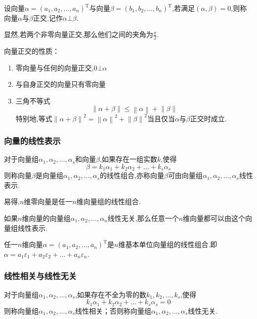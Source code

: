 \begin{definition}
    设向量$\alpha=(a_1,a_2,\dots,a_n)^\mathrm{T}$与向量$\beta=(b_1,b_2,\dots,b_n)^\mathrm{T}$,若满足$(\alpha,\beta)=0$,则称向量$\alpha$与$\beta$正交,记作$\alpha\bot \beta$.
\end{definition}
显然,若两个非零向量正交,那么他们之间的夹角为$\frac{\pi}{2}$.

向量正交的性质：
\begin{enumerate}
    \item 零向量与任何的向量正交,$0\bot \alpha$
    \item 与自身正交的向量只有零向量
    \item 三角不等式
    \begin{equation*}
        \left\lVert \alpha+\beta\right\rVert  \leqslant \left\lVert \alpha\right\rVert +\left\lVert \beta\right\rVert 
    \end{equation*}
    特别地,等式$\left\lVert \alpha+\beta\right\rVert ^2=\left\lVert \alpha\right\rVert ^2+\left\lVert \beta\right\rVert ^2$当且仅当$\alpha$与$\beta$正交时成立.
\end{enumerate}
\subsubsection{向量的线性表示}
\begin{definition}
    对于向量组$\alpha_1,\alpha_2,\dots,\alpha_s$和向量$\beta$,如果存在一组实数$k$,使得
    \begin{equation*}
        \beta=k_1\alpha_1+k_2\alpha_2+\dots+k_s\alpha_s
    \end{equation*}
    则称向量$\beta$是向量组$\alpha_1,\alpha_2,\dots,\alpha_s$的线性组合,亦称向量$\beta$可由向量组$\alpha_1,\alpha_2,\dots,\alpha_s$线性表示.
\end{definition}
易得,$n$维零向量是任一$n$维向量组的线性组合.

\begin{ttheorem}
    如果$n$维向量的向量组$\alpha_1,\alpha_2,\dots,\alpha_n$线性无关,那么任意一个$n$维向量都可以由这个向量组线性表示.
\end{ttheorem}

任一$n$维向量$\alpha=(a_1,a_2,\dots,a_n)^\mathrm{T}$是$n$维基本单位向量组的线性组合.即$\alpha=a_1\varepsilon_1+a_2\varepsilon_2+\dots+a_n\varepsilon_n$.

\subsubsection{线性相关与线性无关}
\begin{definition}
    对于向量组$\alpha_1,\alpha_2,\dots,\alpha_s$,如果存在不全为零的数$k_1,k_2,\dots,k_s$,使得
    \begin{equation*}
        k_1\alpha_1+k_2\alpha_2+\dots+k_s\alpha_s=0
    \end{equation*}
    则称向量组$\alpha_1,\alpha_2,\dots,\alpha_s$线性相关；否则称向量组$\alpha_1,\alpha_2,\dots,\alpha_s$线性无关.
\end{definition}

